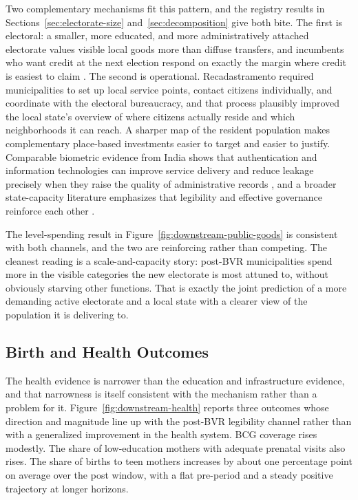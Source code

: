 Two complementary mechanisms fit this pattern, and the registry results in Sections~\ref{sec:electorate-size} and~\ref{sec:decomposition} give both bite. The first is electoral: a smaller, more educated, and more administratively attached electorate values visible local goods more than diffuse transfers, and incumbents who want credit at the next election respond on exactly the margin where credit is easiest to claim \citep{Lindbeck1987BalancedBudgetRedistri,Dixit1996TheDeterminSuccess}. The second is operational. Recadastramento required municipalities to set up local service points, contact citizens individually, and coordinate with the electoral bureaucracy, and that process plausibly improved the local state's overview of where citizens actually reside and which neighborhoods it can reach. A sharper map of the resident population makes complementary place-based investments easier to target and easier to justify. Comparable biometric evidence from India shows that authentication and information technologies can improve service delivery and reduce leakage precisely when they raise the quality of administrative records \citep{Muralidharan2016BuildingStateCapacity,Bossuroy2024BiometriMonitoriService}, and a broader state-capacity literature emphasizes that legibility and effective governance reinforce each other \citep{besleyPersson2011,AcemogluRobinson2019}.

The level-spending result in Figure~\hyperref[fig:downstream-public-goods]{\ref*{fig:downstream-public-goods}} is consistent with both channels, and the two are reinforcing rather than competing. The cleanest reading is a scale-and-capacity story: post-BVR municipalities spend more in the visible categories the new electorate is most attuned to, without obviously starving other functions. That is exactly the joint prediction of a more demanding active electorate and a local state with a clearer view of the population it is delivering to.

\subsection{Birth and Health Outcomes}
\label{ssec:downstream-health}

The health evidence is narrower than the education and infrastructure evidence, and that narrowness is itself consistent with the mechanism rather than a problem for it. Figure~\hyperref[fig:downstream-health]{\ref*{fig:downstream-health}} reports three outcomes whose direction and magnitude line up with the post-BVR legibility channel rather than with a generalized improvement in the health system. BCG coverage rises modestly. The share of low-education mothers with adequate prenatal visits also rises. The share of births to teen mothers increases by about one percentage point on average over the post window, with a flat pre-period and a steady positive trajectory at longer horizons.

